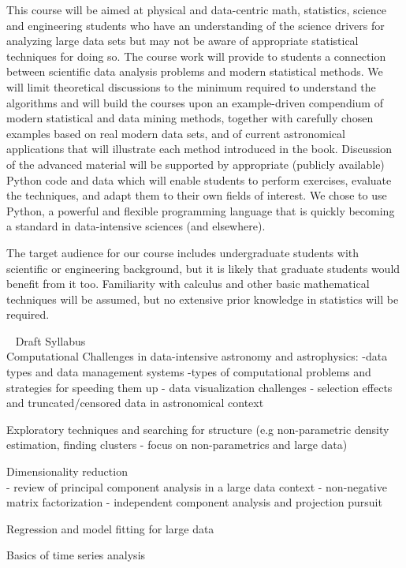 This course will be aimed at physical and data-centric math,
statistics, science and engineering students
who have an understanding of the science drivers for analyzing large data sets but 
may not be aware of appropriate statistical techniques for doing so. The course work 
will provide to students a connection between scientific data analysis problems and 
modern statistical methods. We will limit theoretical discussions to the minimum 
required to understand the algorithms and will build the courses upon an 
example-driven compendium of modern statistical and data mining methods, 
together with carefully chosen examples based on real modern data sets, and of 
current astronomical applications that will illustrate each method introduced in the 
book. Discussion of the advanced material will be supported by appropriate (publicly 
available) Python code and data which will enable students to perform exercises, 
evaluate the techniques, and adapt them to their own fields of interest. We chose to 
use Python, a powerful and flexible programming language that is quickly becoming 
a standard in data-intensive sciences (and elsewhere). 

The target audience for our course includes undergraduate students
with scientific or engineering background, but it is likely that
graduate students would benefit from it too. Familiarity with calculus
and other basic mathematical techniques will be assumed, but no
extensive prior knowledge in statistics will be required.

\item \astrocl~ Draft Syllabus\\
Computational Challenges in data-intensive astronomy and astrophysics:
-data types and data management systems
-types of computational problems and strategies for speeding them up 
- data visualization challenges
- selection effects and truncated/censored data in astronomical context 

Exploratory techniques and searching for structure (e.g non-parametric density estimation, finding clusters - focus on non-parametrics and large data)

Dimensionality reduction\\
- review of principal component analysis in a large data context
- non-negative matrix factorization 
- independent component analysis and projection pursuit 

Regression and model fitting for large data

Basics of time series analysis

